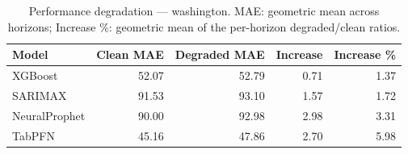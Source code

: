 \begin{table}[h]
\centering
\caption{Performance degradation — washington. MAE: geometric mean across horizons; Increase \%: geometric mean of the per-horizon degraded/clean ratios.}
\label{tab:degradation_summary_washington}
\begin{tabular}{lrrrr}
\toprule
Model & Clean MAE & Degraded MAE & Increase & Increase \% \\
\midrule
XGBoost & 52.07 & 52.79 & 0.71 & 1.37 \\
SARIMAX & 91.53 & 93.10 & 1.57 & 1.72 \\
NeuralProphet & 90.00 & 92.98 & 2.98 & 3.31 \\
TabPFN & 45.16 & 47.86 & 2.70 & 5.98 \\
\bottomrule
\end{tabular}
\end{table}
